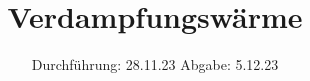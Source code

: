 

\subject{V203}
\title{Verdampfungswärme}
\date{%
  Durchführung: 28.11.23
  \hspace{3em}
  Abgabe: 5.12.23
}



\maketitle
\thispagestyle{empty}
\tableofcontents
\newpage






\printbibliography{}


